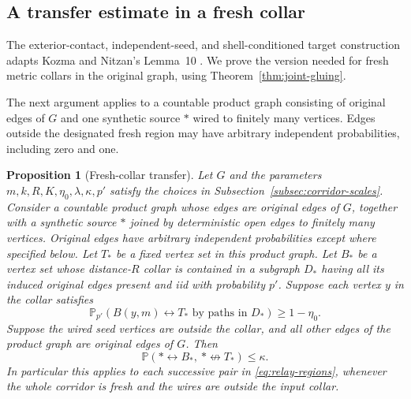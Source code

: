 \documentclass[11pt]{article}
\newtheorem{proposition}[theorem]{Proposition}
\theoremstyle{definition}
\begin{document}
\subsection{A transfer estimate in a fresh collar}

The exterior-contact, independent-seed, and shell-conditioned target
construction adapts Kozma and Nitzan's Lemma~10
\cite[Section~4]{KozmaNitzan2024}. We prove the version needed for fresh
metric collars in the original graph, using Theorem~\ref{thm:joint-gluing}.

The next argument applies to a countable product graph consisting of
original edges of $G$ and one synthetic source $*$ wired to finitely
many vertices. Edges outside the designated fresh region may have
arbitrary independent probabilities, including zero and one.

\begin{proposition}[Fresh-collar transfer]\label{prop:transfer}
Let $G$ and the parameters $m,k,R,K,\eta_0,\lambda,\kappa,p'$ satisfy
the choices in Subsection~\ref{subsec:corridor-scales}. Consider a
countable product graph whose edges are original edges of $G$,
together with a synthetic source $*$ joined by deterministic open
edges to finitely many vertices. Original edges have arbitrary
independent probabilities except where specified below.
Let $T_*$ be a fixed vertex set in this product graph.
Let $B_*$ be a vertex set whose distance-$R$ collar is contained in a
subgraph $D_*$ having all its induced original edges present and iid
with probability $p'$. Suppose each vertex $y$ in the collar satisfies
\[
 \mathbb P_{p'}(B(y,m)\leftrightarrow T_*\text{ by paths in }D_*)
       \ge1-\eta_0.
\]
Suppose the wired seed vertices are outside the collar, and all other
edges of the product graph are original edges of $G$. Then
\begin{equation}\label{eq:fresh-collar-transfer}
 \mathbb P(*\leftrightarrow B_*,\ *\nleftrightarrow T_*)\le\kappa.
\end{equation}
In particular this applies to each successive pair in
\eqref{eq:relay-regions}, whenever the whole corridor is fresh and
the wires are outside the input collar.
\end{proposition}
\end{document}
